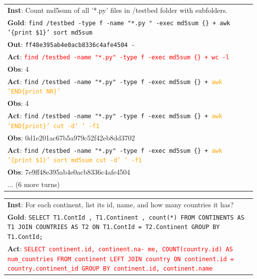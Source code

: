 \begin{table}[H]
\footnotesize
\begin{minipage}[t]{.49\linewidth}
\begin{tabularx}{\textwidth}{X}
\toprule
\textbf{Inst}: Count md5sum of all '*.py' files in /testbed folder with subfolders. \\
\textbf{Gold}: \texttt{find /testbed -type f -name "*.py " -exec md5sum \{\} + \text{\textbar} awk '\{print \$1\}' \text{\textbar} sort \text{\textbar} md5sum} \\
\textbf{Out}: \texttt{ff48e395ab4e0acb8336c4afe4504  -} \\
\midrule
\textbf{Act}: \textcolor{red}{\texttt{find /testbed -name "*.py" -type f -exec md5sum \{\} + \text{\textbar} wc -l}} \\
\textbf{Obs}: 4 \\
\textbf{Act}: \texttt{find /testbed -name "*.py" -type f -exec md5sum \{\} + \text{\textbar} \textcolor{orange}{awk 'END\{print NR\}'}} \\
\textbf{Obs}: 4 \\
\textbf{Act}: \texttt{find /testbed -name "*.py" -type f -exec md5sum \{\} + \text{\textbar} \textcolor{orange}{awk 'END\{print\}' \text{\textbar} cut -d' ' -f1}}  \\
\textbf{Obs}: 0d1e201ac67b5a979c52f42eb8dd3702 \\
\textbf{Act}: \texttt{find /testbed -name "*.py" -type f -exec md5sum \{\} + \text{\textbar} \textcolor{orange}{awk '\{print \$1\}' \text{\textbar} sort \text{\textbar} md5sum \text{\textbar} cut -d' ' -f1}} \\
\textbf{Obs}: 7e9ff48e395ab4e0acb8336c4afe4504 \\
... (6 more turns) \\
\bottomrule
\end{tabularx}
\end{minipage}
\begin{minipage}[t]{.49\linewidth}
\begin{tabularx}{\textwidth}{X}
\toprule
\textbf{Inst}: For each continent, list its id, name, and how many countries it has? \\
\textbf{Gold}: \texttt{SELECT T1.ContId , T1.Continent , count(*) FROM CONTINENTS AS T1 JOIN COUNTRIES AS T2 ON T1.ContId = T2.Continent GROUP BY T1.ContId;} \\
\midrule
\textbf{Act}: \textcolor{red}{\texttt{SELECT continent.id, continent.na- me, COUNT(country.id) AS num\_countries FROM continent LEFT 
JOIN country ON continent.id = country.continent\_id GROUP BY continent.id, continent.name}} \\

\end{tabularx}
\end{minipage}
\end{table}

